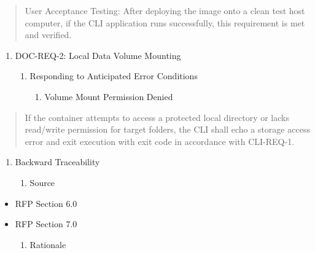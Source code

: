 \documentclass[
]{article}
\begin{document}
\begin{quote}
User Acceptance Testing: After deploying the image onto a clean test
host computer, if the CLI application runs successfully, this
requirement is met and verified.
\end{quote}

\begin{enumerate}
\def\labelenumi{\Roman{enumi})}
\setcounter{enumi}{1}
\item
  DOC-REQ-2: Local Data Volume Mounting

  \begin{enumerate}
  \def\labelenumii{\alph{enumii}.}
  \item
    Responding to Anticipated Error Conditions

    \begin{enumerate}
    \def\labelenumiii{\roman{enumiii}.}
    \item
      Volume Mount Permission Denied
    \end{enumerate}
  \end{enumerate}
\end{enumerate}

\begin{quote}
If the container attempts to access a protected local directory or lacks
read/write permission for target folders, the CLI shall echo a storage
access error and exit execution with exit code in accordance with
CLI-REQ-1.
\end{quote}

\begin{enumerate}
\def\labelenumi{\alph{enumi}.}
\setcounter{enumi}{1}
\item
  Backward Traceability

  \begin{enumerate}
  \def\labelenumii{\roman{enumii}.}
  \item
    Source
  \end{enumerate}
\end{enumerate}

\begin{itemize}
\item
  RFP Section 6.0
\item
  RFP Section 7.0

  \begin{enumerate}
  \def\labelenumi{\roman{enumi}.}
  \item
    Rationale
  \end{enumerate}
\end{itemize}
\end{document}

